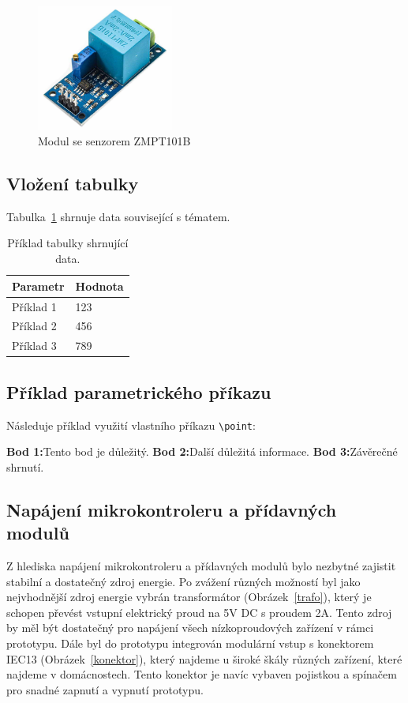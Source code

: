 \documentclass{article}
\newcommand{\sectionbreak}{\clearpage}
\newcommand{\point}[1]{\noindent \textbf{#1:}}
\begin{document}
\begin{figure}[h!]
        \centering
        \includegraphics[width=0.4\textwidth]{images/zmpt101b.jpg}
        \caption{Modul se senzorem ZMPT101B~\cite{obrazek_zmpt}}
        \label{modul se senzorem ZMPT101B}
\end{figure}


\subsection{Vložení tabulky}
Tabulka~\ref{tab:example} shrnuje data související s tématem.

\begin{table}[h!]
    \centering
    \begin{tabular}{l l}
        \hline
        \textbf{Parametr} & \textbf{Hodnota} \\
        \hline
        Příklad 1         & 123              \\
        Příklad 2         & 456              \\
        Příklad 3         & 789              \\
        \hline
    \end{tabular}
    \caption{Příklad tabulky shrnující data.}
    \label{tab:example}
\end{table}


\subsection{Příklad parametrického příkazu}
Následuje příklad využití vlastního příkazu \verb|\point|:

\point{Bod 1}Tento bod je důležitý.
\point{Bod 2}Další důležitá informace.
\point{Bod 3}Závěrečné shrnutí.

\sectionbreak

\subsection{Napájení mikrokontroleru a přídavných modulů} 
Z hlediska napájení mikrokontroleru a přídavných modulů bylo nezbytné zajistit stabilní a dostatečný zdroj 
energie. Po zvážení různých možností byl jako nejvhodnější zdroj energie vybrán transformátor (Obrázek~\ref{trafo}), který je schopen převést vstupní elektrický proud na 5V DC s proudem 2A. Tento zdroj by měl být 
dostatečný pro napájení všech nízkoproudových zařízení v rámci prototypu. Dále byl do prototypu integrován 
modulární vstup s konektorem IEC13 (Obrázek~\ref{konektor}), který najdeme u široké škály různých zařízení, 
které najdeme v domácnostech. Tento konektor je navíc vybaven pojistkou a spínačem pro snadné zapnutí a 
vypnutí prototypu.
\end{document}
